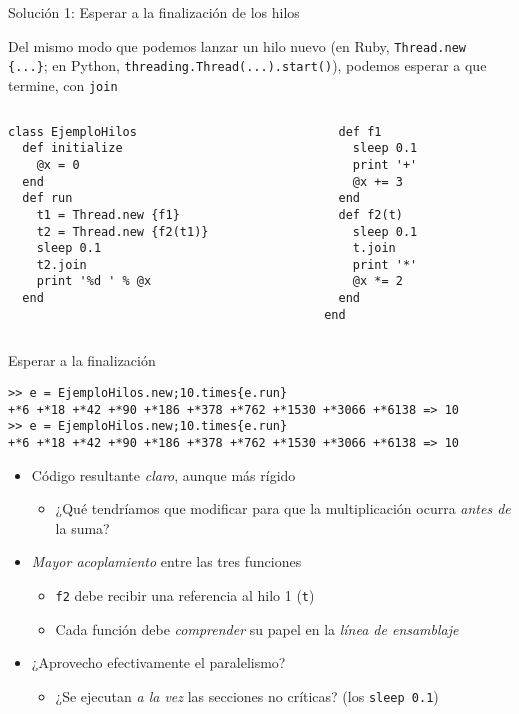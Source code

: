 \documentclass[presentation]{beamer}
\begin{document}
\begin{frame}[label={sec:org6c73916},fragile]{Solución 1: Esperar a la finalización de los hilos}
 \begin{center}
Del mismo modo que podemos lanzar un hilo nuevo (en Ruby, \texttt{Thread.new
\{...\}}; en Python, \texttt{threading.Thread(...).start()}), podemos esperar a que
termine, con \texttt{join}
\end{center}
\begin{columns}\begin{column}{0.5\textwidth}
\begin{verbatim}
class EjemploHilos
  def initialize
    @x = 0
  end
  def run
    t1 = Thread.new {f1}
    t2 = Thread.new {f2(t1)}
    sleep 0.1
    t2.join
    print '%d ' % @x
  end
\end{verbatim}
\end{column} \begin{column}{0.5\textwidth}
\begin{verbatim}
  def f1
    sleep 0.1
    print '+'
    @x += 3
  end
  def f2(t)
    sleep 0.1
    t.join
    print '*'
    @x *= 2
  end
end
\end{verbatim}
\end{column}\end{columns}
\end{frame}

\begin{frame}[label={sec:org6a6cc06},fragile]{Esperar a la finalización}
 \begin{verbatim}
>> e = EjemploHilos.new;10.times{e.run}
+*6 +*18 +*42 +*90 +*186 +*378 +*762 +*1530 +*3066 +*6138 => 10
>> e = EjemploHilos.new;10.times{e.run}
+*6 +*18 +*42 +*90 +*186 +*378 +*762 +*1530 +*3066 +*6138 => 10
\end{verbatim}
\begin{itemize}
\item Código resultante \emph{claro}, aunque más rígido
\begin{itemize}
\item ¿Qué tendríamos que modificar para que la multiplicación ocurra
\emph{antes de} la suma?
\end{itemize}
\item \emph{Mayor acoplamiento} entre las tres funciones
\begin{itemize}
\item \texttt{f2} debe recibir una referencia al hilo 1 (\texttt{t})
\item Cada función debe \emph{comprender} su papel en la \emph{línea de
ensamblaje}
\end{itemize}
\item ¿Aprovecho efectivamente el paralelismo?
\begin{itemize}
\item ¿Se ejecutan \emph{a la vez} las secciones no críticas?
(los \texttt{sleep 0.1})
\end{itemize}
\end{itemize}
\end{frame}
\end{document}
